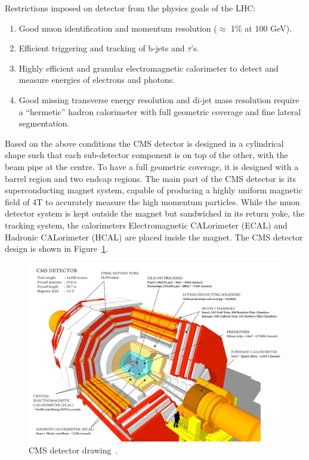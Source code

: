 Restrictions imposed on detector from the physics goals of the LHC:
\begin{enumerate}
	\item Good muon identification and momentum resolution ($\approx$ 1\% at 100 GeV).
	\item Efficient triggering and tracking of b-jets and $\tau$'s.
	\item Highly efficient and granular electromagnetic calorimeter to detect and measure energies of electrons and photons.
	\item Good missing transverse energy resolution and di-jet mass resolution require a ``hermetic'' hadron calorimeter with full geometric coverage and fine lateral segmentation.
\end{enumerate}
Based on the above conditions the CMS detector is designed in a cylindrical shape such that each sub-detector component is on top of the other, with the beam pipe at the centre. 
To have a full geometric coverage, it is designed with a barrel region and two endcap regions. The main part of the CMS detector is its superconducting magnet system, capable of producing a highly uniform magnetic field of 4T to accurately measure the high momentum particles. 
While the muon detector system is kept outside the magnet but sandwiched in its return yoke, the tracking system, the calorimeters Electromagnetic CALorimeter (ECAL) and Hadronic CALorimeter (HCAL) are placed inside the magnet.
The CMS detector design is shown in Figure~\ref{fig:CMS-detector}.
\begin{figure}[!htbp]
	\centering
	\includegraphics[width=1.1\textwidth]{figures/LHC/cms_120918_03.pdf}
	\caption{CMS detector drawing~\cite{Taylor2011}.}
	\label{fig:CMS-detector}
\end{figure}


